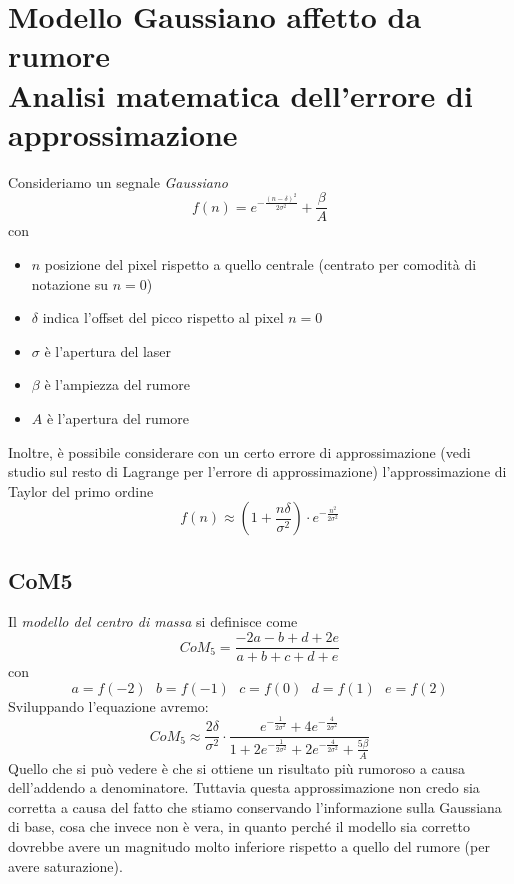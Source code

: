 \newpage

\section*{Modello Gaussiano affetto da rumore\\Analisi matematica dell'errore di approssimazione}

Consideriamo un segnale \textit{Gaussiano}
\begin{equation}
f(n) = e^{-\frac{(n-\delta)^2}{2\sigma^2}}+\frac{\beta}{A}
\end{equation}
con
\begin{itemize}
  \item $n$ posizione del pixel rispetto a quello centrale (centrato per comodità di notazione su $n=0$)
  \item $\delta$ indica l'offset del picco rispetto al pixel $n=0$
  \item $\sigma$ è l'apertura del laser
  \item $\beta$ è l'ampiezza del rumore
  \item $A$ è l'apertura del rumore
\end{itemize}
Inoltre, è possibile considerare con un certo errore di approssimazione (vedi studio sul resto di Lagrange per l'errore di approssimazione) l'approssimazione di Taylor del primo ordine
\begin{equation*}
f(n) \approx \left( 1+\frac{n\delta}{\sigma^2} \right) \cdot e^{-\frac{n^2}{2\sigma^2}}
\end{equation*}

\subsection*{CoM5}
Il \textit{modello del centro di massa} si definisce come
\begin{equation*}
CoM_5 = \frac{-2a-b+d+2e}{a+b+c+d+e}
\end{equation*}
con
\begin{equation*}
  a=f(-2) \ \ \ b=f(-1) \ \ \ c=f(0) \ \ \ d=f(1) \ \ \ e=f(2)
\end{equation*}
Sviluppando l'equazione avremo:
\begin{equation}
  CoM_5 \approx \frac{2\delta}{\sigma^2} \cdot \frac{
    e^{-\frac{1}{2\sigma^2}}+4e^{-\frac{4}{2\sigma^2}}
  }{
    1+2e^{-\frac{1}{2\sigma^2}}+2e^{-\frac{4}{2\sigma^2}} + \frac{5\beta}{A}
  }
\end{equation}
Quello che si può vedere è che si ottiene un risultato più rumoroso a causa dell'addendo a denominatore. Tuttavia questa approssimazione non credo sia corretta a causa del fatto che stiamo conservando l'informazione sulla Gaussiana di base, cosa che invece non è vera, in quanto perché il modello sia corretto dovrebbe avere un magnitudo molto inferiore rispetto a quello del rumore (per avere saturazione). \\

